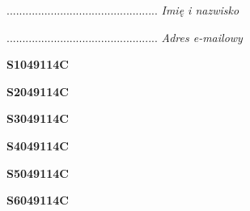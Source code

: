 \begin{turn}{90}\begin{minipage}{\linewidth} \vspace{20mm} ................................................  \textit{Imię i nazwisko}\end{minipage}\end{turn}

\begin{turn}{90}\begin{minipage}{\linewidth} \vspace{20mm} ................................................  \textit{Adres e-mailowy}\end{minipage}\end{turn}

\begin{turn}{90}\huge \begin{minipage}{\linewidth} \vspace{10mm}\textbf{S1049114C}\end{minipage}\end{turn}

\begin{turn}{90}\huge \begin{minipage}{\linewidth} \vspace{10mm}\textbf{S2049114C}\end{minipage}\end{turn}

\begin{turn}{90}\huge \begin{minipage}{\linewidth} \vspace{10mm}\textbf{S3049114C}\end{minipage}\end{turn}

\begin{turn}{90}\huge \begin{minipage}{\linewidth} \vspace{10mm}\textbf{S4049114C}\end{minipage}\end{turn}

\begin{turn}{90}\huge \begin{minipage}{\linewidth} \vspace{10mm}\textbf{S5049114C}\end{minipage}\end{turn}

\begin{turn}{90}\huge \begin{minipage}{\linewidth} \vspace{10mm}\textbf{S6049114C}\end{minipage}\end{turn}

